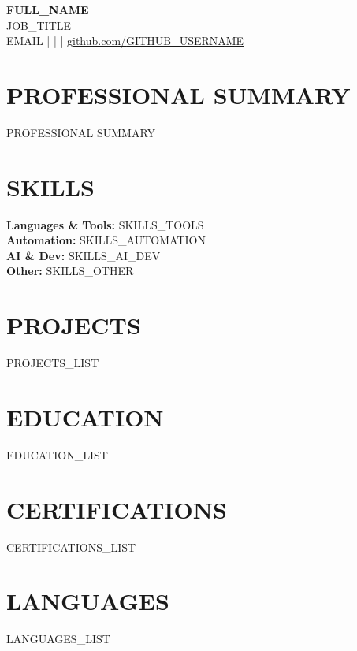 \documentclass[11pt,a4paper]{article}
\begin{document}
\begin{center}
    {\LARGE \textbf{{{FULL_NAME}}}} \\
    \vspace{4pt}
    {{JOB_TITLE}} \\
    \vspace{4pt}
    {{EMAIL}} \quad |  \quad |  \quad | \quad \href{https://github.com/{{GITHUB_USERNAME}}}{github.com/{{GITHUB_USERNAME}}}
\end{center}

\vspace{6pt}

\section*{PROFESSIONAL SUMMARY}
{{PROFESSIONAL SUMMARY}}

\section*{SKILLS}

\textbf{Languages \& Tools:} {{SKILLS_TOOLS}} \\

\textbf{Automation:} {{SKILLS_AUTOMATION}} \\

\textbf{AI \& Dev:} {{SKILLS_AI_DEV}} \\

\textbf{Other:} {{SKILLS_OTHER}} \\

\section*{PROJECTS}

{{PROJECTS_LIST}}

\section*{EDUCATION}

{{EDUCATION_LIST}}

\section*{CERTIFICATIONS}

{{CERTIFICATIONS_LIST}}

\section*{LANGUAGES}

{{LANGUAGES_LIST}}
\end{document}
